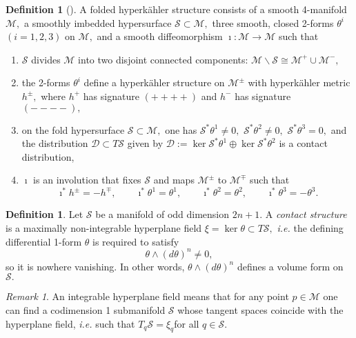 \documentclass[a4paper,onecolumn,12pt]{article}
\theoremstyle{definition}
\newtheorem{defn}[thm]{Definition}
\theoremstyle{remark}
\newtheorem{rmk}[thm]{Remark}
\newcommand{\ie}{\emph{i.e.} }
\newcommand{\HK}{hyperk\"ahler }
\begin{document}
\begin{defn}[\cite{biquard_2015,evanescent_2016}]
	A folded \HK structure consists of a smooth 4-manifold $\mathcal{M},$ a smoothly imbedded hypersurface $\mathcal{S}\subset\mathcal{M},$ three smooth, closed 2-forms $\theta^{i}$ $(i=1,2,3)$ on $\mathcal{M},$ and a smooth diffeomorphism $\imath:\mathcal{M}\to\mathcal{M}$ such that
	\begin{enumerate}
		\item $\mathcal{S}$ divides $\mathcal{M}$ into two disjoint connected components: $\mathcal{M}\backslash\mathcal{S} \cong \mathcal{M}^{+} \cup \mathcal{M}^{-},$
		\item the 2-forms $\theta^{i}$ define a \HK structure on $\mathcal{M}^{\pm}$ with \HK metric $h^{\pm},$ where $h^{+}$ has signature $(++++)$ and $h^{-}$ has signature $(----),$
		\item on the fold hypersurface $\mathcal{S}\subset \mathcal{M},$ one has $\mathcal{S}^{\ast}\theta^{1} \neq 0,$ $\mathcal{S}^{\ast}\theta^{2} \neq 0,$
		$\mathcal{S}^{\ast}\theta^{3} = 0,$ and the distribution $\mathcal{D}\subset T\mathcal{S}$ given by $\mathcal{D} := \ker\mathcal{S}^{\ast}\theta^{1}\oplus\ker\mathcal{S}^{\ast}\theta^{2}$ is a contact distribution,
		\item $\imath$ is an involution that fixes $\mathcal{S}$ and maps $\mathcal{M}^{\pm}$ to $\mathcal{M}^{\mp}$ such that
		\begin{equation}
			\imath^{\ast}h^{\pm} = -h^{\mp},\qquad \imath^{\ast}\theta^{1} = \theta^{1},\qquad \imath^{\ast}\theta^{2} = \theta^{2},\qquad
			\imath^{\ast}\theta^{3} = -\theta^{3}.
		\end{equation}
	\end{enumerate}
\end{defn}

\begin{defn}
	Let $\mathcal{S}$ be a manifold of odd dimension $2n+1.$ A \emph{contact structure} is a maximally non-integrable hyperplane field $\xi = \ker \theta \subset T\mathcal{S},$ \ie the defining differential 1-form $\theta$ is required to satisfy
	\begin{equation}
		\theta\wedge(d\theta)^{n}\neq 0,
	\end{equation}
	so it is nowhere vanishing. In other words, $\theta\wedge(d\theta)^{n}$ defines a volume form on $\mathcal{S}.$
\end{defn}

\begin{rmk}
	An integrable hyperplane field means that for any point $p\in \mathcal{M}$ one can find a codimension 1 submanifold $\mathcal{S}$ whose tangent spaces coincide with the hyperplane field, \ie such that $T_{q}\mathcal{S}=\xi_{q}$for all $q\in\mathcal{S}.$
\end{rmk}
\end{document}
